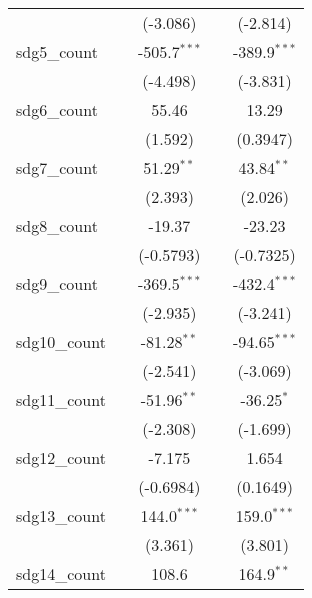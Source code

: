\begin{tabular}{lcccc}
                     &                  & (-3.086)         &                 & (-2.814)\\   
   sdg5\_count       &                  & -505.7$^{***}$   &                 & -389.9$^{***}$\\   
                     &                  & (-4.498)         &                 & (-3.831)\\   
   sdg6\_count       &                  & 55.46            &                 & 13.29\\   
                     &                  & (1.592)          &                 & (0.3947)\\   
   sdg7\_count       &                  & 51.29$^{**}$     &                 & 43.84$^{**}$\\   
                     &                  & (2.393)          &                 & (2.026)\\   
   sdg8\_count       &                  & -19.37           &                 & -23.23\\   
                     &                  & (-0.5793)        &                 & (-0.7325)\\   
   sdg9\_count       &                  & -369.5$^{***}$   &                 & -432.4$^{***}$\\   
                     &                  & (-2.935)         &                 & (-3.241)\\   
   sdg10\_count      &                  & -81.28$^{**}$    &                 & -94.65$^{***}$\\   
                     &                  & (-2.541)         &                 & (-3.069)\\   
   sdg11\_count      &                  & -51.96$^{**}$    &                 & -36.25$^{*}$\\   
                     &                  & (-2.308)         &                 & (-1.699)\\   
   sdg12\_count      &                  & -7.175           &                 & 1.654\\   
                     &                  & (-0.6984)        &                 & (0.1649)\\   
   sdg13\_count      &                  & 144.0$^{***}$    &                 & 159.0$^{***}$\\   
                     &                  & (3.361)          &                 & (3.801)\\   
   sdg14\_count      &                  & 108.6            &                 & 164.9$^{**}$\\   

\end{tabular}

